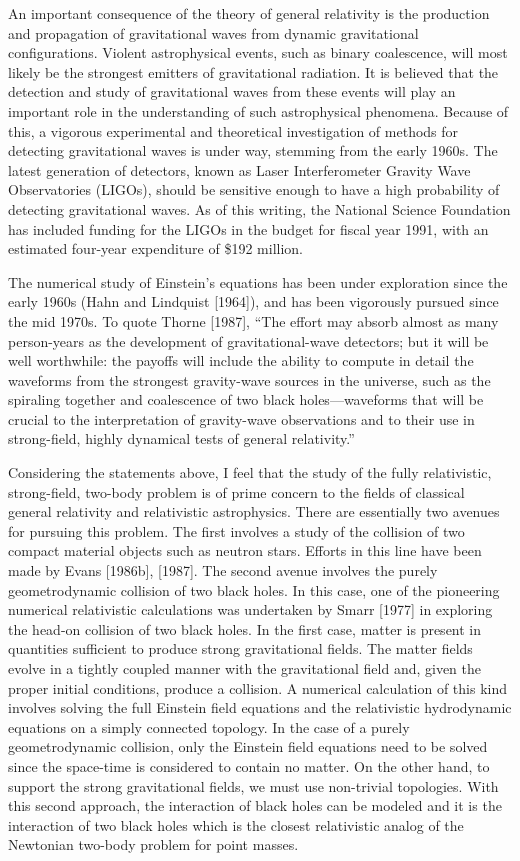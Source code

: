 An important consequence of the theory of general relativity is the production
and propagation of gravitational waves from dynamic gravitational
configurations.  Violent astrophysical events, such as binary coalescence, will
most likely be the strongest emitters of gravitational radiation.  It is
believed that the detection and study of gravitational waves from these events
will play an important role in the understanding of such astrophysical
phenomena.  Because of this, a vigorous experimental and theoretical
investigation of methods for detecting gravitational waves is under way,
stemming from the early 1960s.  The latest generation of detectors, known as
Laser Interferometer Gravity Wave Observatories (LIGOs), should be sensitive
enough to have a high probability of detecting gravitational waves.  As of this
writing, the National Science Foundation has included funding for the LIGOs in
the budget for fiscal year 1991, with an estimated four-year expenditure of
\$192 million.

The numerical study of Einstein's equations has been under exploration since the
early 1960s (Hahn and Lindquist [1964]), and has been vigorously pursued since
the mid 1970s.  To quote Thorne [1987], ``The effort may absorb almost as many
person-years as the development of gravitational-wave detectors; but it will be
well worthwhile:  the payoffs will include the ability to compute in detail the
waveforms from the strongest gravity-wave sources in the universe, such as the
spiraling together and coalescence of two black holes---waveforms that will be
crucial to the interpretation of gravity-wave observations and to their use in
strong-field, highly dynamical tests of general relativity.''

Considering the statements above, I feel that the study of the fully
relativistic, strong-field, two-body problem is of prime concern to the fields of
classical general relativity and relativistic astrophysics.  There are
essentially two avenues for pursuing this problem.  The first involves a study
of the collision of two compact material objects such as neutron stars.  Efforts
in this line have been made by Evans [1986b], [1987].  The second avenue
involves the purely geometrodynamic collision of two black holes.  In this case,
one of the pioneering numerical relativistic calculations was undertaken by Smarr
[1977] in exploring the head-on collision of two black holes.  In the first
case, matter is present in quantities sufficient to produce strong gravitational
fields.  The matter fields evolve in a tightly coupled manner with the
gravitational field and, given the proper initial conditions, produce a
collision.  A numerical calculation of this kind involves solving the full
Einstein field equations and the relativistic hydrodynamic equations on a simply
connected topology.  In the case of a purely geometrodynamic collision, only the
Einstein field equations need to be solved since the space-time is considered to
contain no matter.  On the other hand, to support the strong gravitational
fields, we must use non-trivial topologies.  With this second approach, the
interaction of black holes can be modeled and it is the interaction of two black
holes which is the closest relativistic analog of the Newtonian two-body problem
for point masses.

